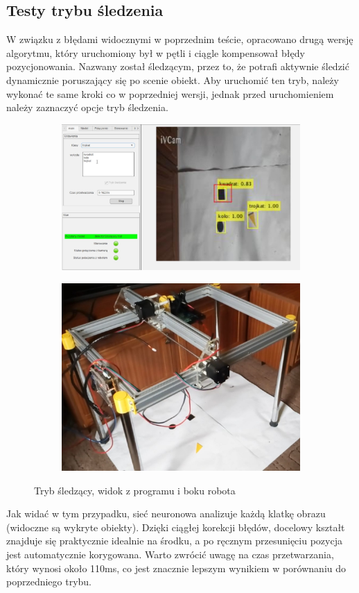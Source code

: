 \subsection{Testy trybu śledzenia}
W związku z błędami widocznymi w poprzednim teście, opracowano drugą wersję algorytmu, który uruchomiony był w pętli 
i ciągle kompensował błędy pozycjonowania. Nazwany został śledzącym, przez to, że potrafi aktywnie śledzić dynamicznie poruszający się po scenie obiekt.
Aby uruchomić ten tryb, należy wykonać te same kroki co w poprzedniej wersji, jednak przed uruchomieniem należy zaznaczyć opcje tryb śledzenia.
\begin{figure}[H]
	\centering
	\begin{subfigure}{}
		\includegraphics[width=0.5\linewidth]{pages/testy/img/test2_1_2.jpg}
	\end{subfigure}
	\begin{subfigure}{}
		\includegraphics[width=0.4\linewidth]{pages/testy/img/test2_1_1.jpg}
	\end{subfigure}
	\caption{Tryb śledzący, widok z programu i boku robota}
\end{figure}
Jak widać w tym przypadku, sieć neuronowa analizuje każdą klatkę obrazu (widoczne są wykryte obiekty). 
Dzięki ciągłej korekcji błędów, docelowy kształt znajduje się praktycznie idealnie na środku, a po ręcznym przesunięciu
 pozycja jest automatycznie korygowana. Warto zwrócić uwagę na czas przetwarzania, który wynosi około 110ms, 
 co jest znacznie lepszym wynikiem w porównaniu do poprzedniego trybu. 
